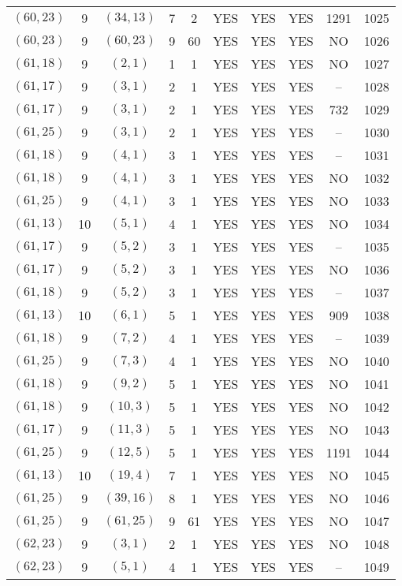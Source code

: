 \begin{longtable}{|c|c|c|c|c|c|c|c|c|c|}
$(60, 23)$ & 9 & $(34, 13)$ & 7 & 2 & YES & YES & YES & 1291 & 1025\\
$(60, 23)$ & 9 & $(60, 23)$ & 9 & 60 & YES & YES & YES & NO & 1026\\
$(61, 18)$ & 9 & $(2, 1)$ & 1 & 1 & YES & YES & YES & NO & 1027\\
$(61, 17)$ & 9 & $(3, 1)$ & 2 & 1 & YES & YES & YES & -- & 1028\\
$(61, 17)$ & 9 & $(3, 1)$ & 2 & 1 & YES & YES & YES & 732 & 1029\\
$(61, 25)$ & 9 & $(3, 1)$ & 2 & 1 & YES & YES & YES & -- & 1030\\
$(61, 18)$ & 9 & $(4, 1)$ & 3 & 1 & YES & YES & YES & -- & 1031\\
$(61, 18)$ & 9 & $(4, 1)$ & 3 & 1 & YES & YES & YES & NO & 1032\\
$(61, 25)$ & 9 & $(4, 1)$ & 3 & 1 & YES & YES & YES & NO & 1033\\
$(61, 13)$ & 10 & $(5, 1)$ & 4 & 1 & YES & YES & YES & NO & 1034\\
$(61, 17)$ & 9 & $(5, 2)$ & 3 & 1 & YES & YES & YES & -- & 1035\\
$(61, 17)$ & 9 & $(5, 2)$ & 3 & 1 & YES & YES & YES & NO & 1036\\
$(61, 18)$ & 9 & $(5, 2)$ & 3 & 1 & YES & YES & YES & -- & 1037\\
$(61, 13)$ & 10 & $(6, 1)$ & 5 & 1 & YES & YES & YES & 909 & 1038\\
$(61, 18)$ & 9 & $(7, 2)$ & 4 & 1 & YES & YES & YES & -- & 1039\\
$(61, 25)$ & 9 & $(7, 3)$ & 4 & 1 & YES & YES & YES & NO & 1040\\
$(61, 18)$ & 9 & $(9, 2)$ & 5 & 1 & YES & YES & YES & NO & 1041\\
$(61, 18)$ & 9 & $(10, 3)$ & 5 & 1 & YES & YES & YES & NO & 1042\\
$(61, 17)$ & 9 & $(11, 3)$ & 5 & 1 & YES & YES & YES & NO & 1043\\
$(61, 25)$ & 9 & $(12, 5)$ & 5 & 1 & YES & YES & YES & 1191 & 1044\\
$(61, 13)$ & 10 & $(19, 4)$ & 7 & 1 & YES & YES & YES & NO & 1045\\
$(61, 25)$ & 9 & $(39, 16)$ & 8 & 1 & YES & YES & YES & NO & 1046\\
$(61, 25)$ & 9 & $(61, 25)$ & 9 & 61 & YES & YES & YES & NO & 1047\\
$(62, 23)$ & 9 & $(3, 1)$ & 2 & 1 & YES & YES & YES & NO & 1048\\
$(62, 23)$ & 9 & $(5, 1)$ & 4 & 1 & YES & YES & YES & -- & 1049\\

\end{longtable}
